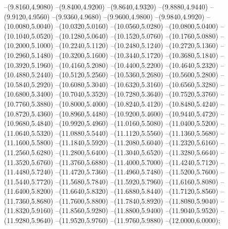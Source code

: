 {	--(9.8160,4.9080)
	--(9.8400,4.9200)
	--(9.8640,4.9320)
	--(9.8880,4.9440)
	--(9.9120,4.9560)
	--(9.9360,4.9680)
	--(9.9600,4.9800)
	--(9.9840,4.9920)
	--(10.0080,5.0040)
	--(10.0320,5.0160)
	--(10.0560,5.0280)
	--(10.0800,5.0400)
	--(10.1040,5.0520)
	--(10.1280,5.0640)
	--(10.1520,5.0760)
	--(10.1760,5.0880)
	--(10.2000,5.1000)
	--(10.2240,5.1120)
	--(10.2480,5.1240)
	--(10.2720,5.1360)
	--(10.2960,5.1480)
	--(10.3200,5.1600)
	--(10.3440,5.1720)
	--(10.3680,5.1840)
	--(10.3920,5.1960)
	--(10.4160,5.2080)
	--(10.4400,5.2200)
	--(10.4640,5.2320)
	--(10.4880,5.2440)
	--(10.5120,5.2560)
	--(10.5360,5.2680)
	--(10.5600,5.2800)
	--(10.5840,5.2920)
	--(10.6080,5.3040)
	--(10.6320,5.3160)
	--(10.6560,5.3280)
	--(10.6800,5.3400)
	--(10.7040,5.3520)
	--(10.7280,5.3640)
	--(10.7520,5.3760)
	--(10.7760,5.3880)
	--(10.8000,5.4000)
	--(10.8240,5.4120)
	--(10.8480,5.4240)
	--(10.8720,5.4360)
	--(10.8960,5.4480)
	--(10.9200,5.4600)
	--(10.9440,5.4720)
	--(10.9680,5.4840)
	--(10.9920,5.4960)
	--(11.0160,5.5080)
	--(11.0400,5.5200)
	--(11.0640,5.5320)
	--(11.0880,5.5440)
	--(11.1120,5.5560)
	--(11.1360,5.5680)
	--(11.1600,5.5800)
	--(11.1840,5.5920)
	--(11.2080,5.6040)
	--(11.2320,5.6160)
	--(11.2560,5.6280)
	--(11.2800,5.6400)
	--(11.3040,5.6520)
	--(11.3280,5.6640)
	--(11.3520,5.6760)
	--(11.3760,5.6880)
	--(11.4000,5.7000)
	--(11.4240,5.7120)
	--(11.4480,5.7240)
	--(11.4720,5.7360)
	--(11.4960,5.7480)
	--(11.5200,5.7600)
	--(11.5440,5.7720)
	--(11.5680,5.7840)
	--(11.5920,5.7960)
	--(11.6160,5.8080)
	--(11.6400,5.8200)
	--(11.6640,5.8320)
	--(11.6880,5.8440)
	--(11.7120,5.8560)
	--(11.7360,5.8680)
	--(11.7600,5.8800)
	--(11.7840,5.8920)
	--(11.8080,5.9040)
	--(11.8320,5.9160)
	--(11.8560,5.9280)
	--(11.8800,5.9400)
	--(11.9040,5.9520)
	--(11.9280,5.9640)
	--(11.9520,5.9760)
	--(11.9760,5.9880)
	--(12.0000,6.0000);
}
